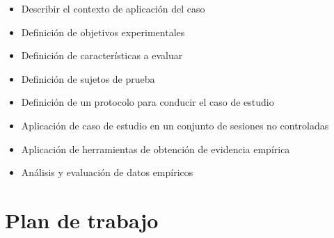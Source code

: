 \documentclass[11pt,letterpaper]{article}
\begin{document}
\begin{itemize}
\item Describir el contexto de aplicación del caso
\item Definición de objetivos experimentales
\item Definición de características a evaluar
\item Definición de sujetos de prueba
\item Definición de un protocolo para conducir el caso de estudio
\item Aplicación de caso de estudio en un conjunto de sesiones no controladas
\item Aplicación de herramientas de obtención de evidencia empírica
\item Análisis y evaluación de datos empíricos
\end{itemize}




%

\section{Plan de trabajo}
\end{document}
